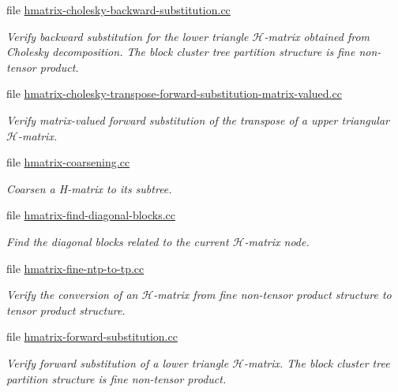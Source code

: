 \begin{DoxyCompactItemize}
file \hyperlink{hmatrix-cholesky-backward-substitution_8cc}{hmatrix-\/cholesky-\/backward-\/substitution.\+cc}
\begin{DoxyCompactList}\small\item\em Verify backward substitution for the lower triangle $\mathcal{H}$-\/matrix obtained from Cholesky decomposition. The block cluster tree partition structure is fine non-\/tensor product. \end{DoxyCompactList}\item 
file \hyperlink{hmatrix-cholesky-transpose-forward-substitution-matrix-valued_8cc}{hmatrix-\/cholesky-\/transpose-\/forward-\/substitution-\/matrix-\/valued.\+cc}
\begin{DoxyCompactList}\small\item\em Verify matrix-\/valued forward substitution of the transpose of a upper triangular $\mathcal{H}$-\/matrix. \end{DoxyCompactList}\item 
file \hyperlink{hmatrix-coarsening_8cc}{hmatrix-\/coarsening.\+cc}
\begin{DoxyCompactList}\small\item\em Coarsen a H-\/matrix to its subtree. \end{DoxyCompactList}\item 
file \hyperlink{hmatrix-find-diagonal-blocks_8cc}{hmatrix-\/find-\/diagonal-\/blocks.\+cc}
\begin{DoxyCompactList}\small\item\em Find the diagonal blocks related to the current $\mathcal{H}$-\/matrix node. \end{DoxyCompactList}\item 
file \hyperlink{hmatrix-fine-ntp-to-tp_8cc}{hmatrix-\/fine-\/ntp-\/to-\/tp.\+cc}
\begin{DoxyCompactList}\small\item\em Verify the conversion of an $\mathcal{H}$-\/matrix from fine non-\/tensor product structure to tensor product structure. \end{DoxyCompactList}\item 
file \hyperlink{hmatrix-forward-substitution_8cc}{hmatrix-\/forward-\/substitution.\+cc}
\begin{DoxyCompactList}\small\item\em Verify forward substitution of a lower triangle $\mathcal{H}$-\/matrix. The block cluster tree partition structure is fine non-\/tensor product. \end{DoxyCompactList}\item 

\end{DoxyCompactItemize}
